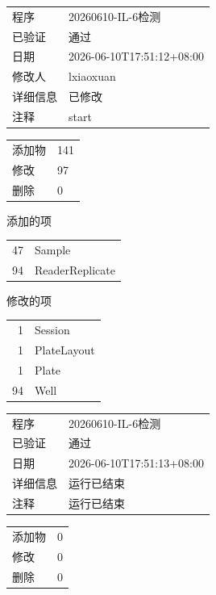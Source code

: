 \documentclass[UTF8,10pt,a4paper,fontset=fandol]{ctexart}
\begin{document}
\begin{flushleft}
\vspace{0.75em}

\begin{tabular}{@{}ll}
程序 & 20260610-IL-6检测\\
已验证 & 通过\\
日期 & 2026-06-10T17:51:12+08:00\\
修改人 & lxiaoxuan\\
详细信息 & 已修改\\
注释 & start\\
\end{tabular}

\vspace{0.5em}

\begin{tabular}{@{}ll}
添加物 & 141\\
修改 & 97\\
删除 & 0
\end{tabular}

\vspace{0.5em}

添加的项

\begin{tabular}{@{}rl}
47 & Sample\\
94 & ReaderReplicate
\end{tabular}

\vspace{0.5em}

修改的项

\begin{tabular}{@{}rl}
1 & Session\\
1 & PlateLayout\\
1 & Plate\\
94 & Well
\end{tabular}

\vspace{0.75em}

\begin{tabular}{@{}ll}
程序 & 20260610-IL-6检测\\
已验证 & 通过\\
日期 & 2026-06-10T17:51:13+08:00\\
详细信息 & 运行已结束\\
注释 & 运行已结束\\
\end{tabular}

\vspace{0.5em}

\begin{tabular}{@{}ll}
添加物 & 0\\
修改 & 0\\
删除 & 0
\end{tabular}


\end{flushleft}
\end{document}
